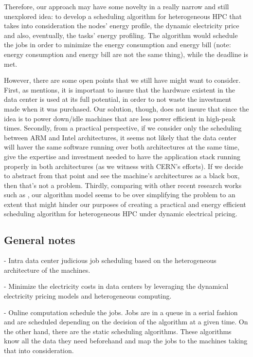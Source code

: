 Therefore, our approach may have some novelty in a really narrow and still
unexplored idea: to develop a scheduling algorithm for heterogeneous HPC that
takes into consideration the nodes' energy profile, the dynamic electricity
price and also, eventually, the tasks' energy profiling. The algorithm would
schedule the jobs in order to minimize the energy consumption and energy bill
(note: energy consumption and energy bill are not the same thing), while the
deadline is met. 

However, there are some open points that we still have might want to
consider. First, as \cite{DYN_PRICING_HPC} mentions, it is important to insure
that the hardware existent in the data center is used at its full potential, in
order to not waste the investment made when it was purchased. Our solution,
though, does not insure that since the idea is to power down/idle machines that 
are less power efficient in high-peak times. Secondly, from a practical
perspective, if we consider only the scheduling between ARM and Intel architectures, 
it seems not likely that the data center will haver the same software running
over both architectures at the same time, give the expertise and investment
needed to have the application stack running properly in both architectures (as
we witness with CERN's efforts). If we decide to abstract from that point and
see the machine's architectures as a black box, then that's not a problem. Thirdly, 
comparing with other recent research works
such as \cite{TASK_SCHED}, our algorithm model seems to be over simplifying the
problem to an extent that might hinder our purposes of creating a practical and
energy efficient scheduling algorithm for heterogeneous HPC under dynamic
electrical pricing.



\subsection{General notes}

- Intra data center judicious job scheduling based on the heterogeneous
  architecture of the machines.

- Minimize the electricity costs in data centers by leveraging the dynamical 
  electricity pricing models and heterogeneous computing.

 - Online computation schedule the jobs. Jobs are in a queue in a serial fashion
  and are scheduled depending on the decision of the algorithm at a given time.
  On the other hand, there are the static scheduling algorithms. These
  algorithms know all the data they need beforehand and map the jobs to the
  machines taking that into consideration.

